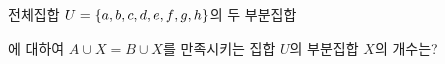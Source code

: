 전체집합 $U=\{a{,}\mkern3mu\mathopen{}b{,}\mkern3mu\mathopen{}c{,}\mkern3mu\mathopen{}d{,}\mkern3mu\mathopen{}e{,}\mkern3mu\mathopen{}f{,}\mkern3mu\mathopen{}g{,}\mkern3mu\mathopen{}h\}$의 두 부분집합\par\smallskip{}\par\smallskip\noindent 에 대하여 $A\cup X=B\cup X$를 만족시키는 집합 $U$의 부분집합 $X$의 개수는?
